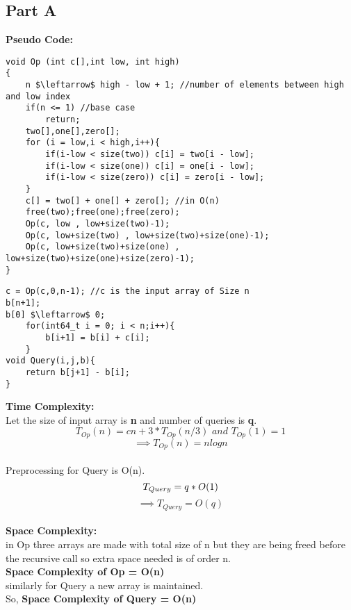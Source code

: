 \documentclass[a4paper,11pt]{article}
\theoremstyle{mytheor}
\begin{document}
\subsection*{Part A}
\textbf{Pseudo Code: }
\begin{lstlisting}[label={list:first},caption=Op, mathescape = true]
void Op (int c[],int low, int high)
{
	n $\leftarrow$ high - low + 1; //number of elements between high and low index
	if(n <= 1) //base case
	    return;
    two[],one[],zero[];
    for (i = low,i < high,i++){
        if(i-low < size(two)) c[i] = two[i - low];
        if(i-low < size(one)) c[i] = one[i - low];
        if(i-low < size(zero)) c[i] = zero[i - low];
    }
    c[] = two[] + one[] + zero[]; //in O(n)
    free(two);free(one);free(zero);
    Op(c, low , low+size(two)-1);
    Op(c, low+size(two) , low+size(two)+size(one)-1);
    Op(c, low+size(two)+size(one) , low+size(two)+size(one)+size(zero)-1);
}
\end{lstlisting}
\begin{lstlisting}[label={list:first},caption=Query, mathescape = true]
c = Op(c,0,n-1); //c is the input array of Size n
b[n+1];
b[0] $\leftarrow$ 0;
	for(int64_t i = 0; i < n;i++){
		b[i+1] = b[i] + c[i];
	}
void Query(i,j,b){
    return b[j+1] - b[i];
}
\end{lstlisting}

\textbf{Time Complexity: }\\
Let the size of input array is \textbf{n} and number of queries is \textbf{q}.\\
\[T_{Op}(n) = cn + 3 * T_{Op}(n/3) \textit{\ and\ } T_{Op}(1) = 1 \]
\[\implies T_{Op}(n) = nlogn\]\\
Preprocessing for Query is O(n).\\
\[T_{Query} = q * O(1)\\\]
\[\implies T_{Query} = O(q)\]\\

\textbf{Space Complexity: }\\
in Op three arrays are made with total size of n but they are being freed before the recursive call so extra space needed is of order n.\\
\textbf{Space Complexity of Op = O(n)}\\
similarly for Query a new array is maintained.\\
So, \textbf{Space Complexity of Query = O(n)}\\
\end{document}
